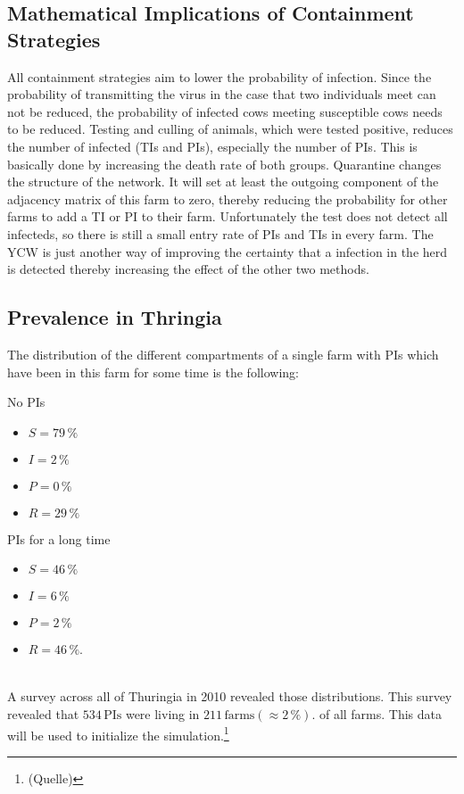 \subsection{Mathematical Implications of Containment Strategies}
All containment strategies aim to lower the probability of infection. Since the probability of transmitting the virus in the case that two individuals meet can not be reduced, the probability of infected cows meeting susceptible cows needs to be reduced. 
Testing and culling of animals, which were tested positive, reduces the number of infected (TIs and PIs), especially the number of PIs. This is basically done by increasing the death rate of both groups. 
Quarantine changes the structure of the network. It will set at least the outgoing component of the adjacency matrix of this farm to zero, thereby reducing the probability for other farms to add a TI or PI to their farm. Unfortunately the test does not detect all infecteds, so there is still a small entry rate of PIs and TIs in every farm.
The YCW is just another way of improving the certainty that a infection in the herd is detected thereby increasing the effect of the other two methods.

\subsection{Prevalence in Thringia}\label{chap:rlDataRegulationGermany}
The distribution of the different compartments of a single farm with PIs which have been in this farm for some time is the following:
\\
\begin{minipage}[t]{0.5\linewidth}
No PIs
    \begin{itemize}
    \item $S= 79\,\%$
\item $I= 2\,\%$
\item $P= 0\,\%$ 
\item $R= 29\,\%$
    \end{itemize}
\end{minipage}
\begin{minipage}[t]{0.5\linewidth}
PIs for a long time
    \begin{itemize}
    \item $S= 46\,\%$
\item $I= 6\,\%$
\item $P= 2\,\%$ 
\item $R= 46\,\%$.
    \end{itemize}
\end{minipage}
\\
A survey across all of Thuringia in 2010 revealed those distributions. This survey revealed that $534\,\text{PIs}$ were living in $211\,\text{farms}(\approx 2\,\%)$. of all farms. This data will be used to initialize the simulation.\footnote{ (Quelle) }


